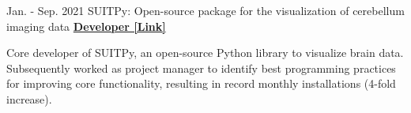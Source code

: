 \begin{cventries}
    
  \cventry
    {Jan. - Sep. 2021} %
  	{SUITPy: Open-source package for the visualization of cerebellum imaging data} %
  	{\href{https://suitpy.readthedocs.io/en/latest/}{\textbf{Developer [Link]}}}
  	{}
    {
      \begin{cvitems} %
      	\item {Core developer of SUITPy, an open-source Python library to visualize brain data. Subsequently worked as project manager to identify best programming practices for improving core functionality, resulting in record monthly installations (4-fold increase).}
      \end{cvitems}
    }
    
    
    

\end{cventries}
